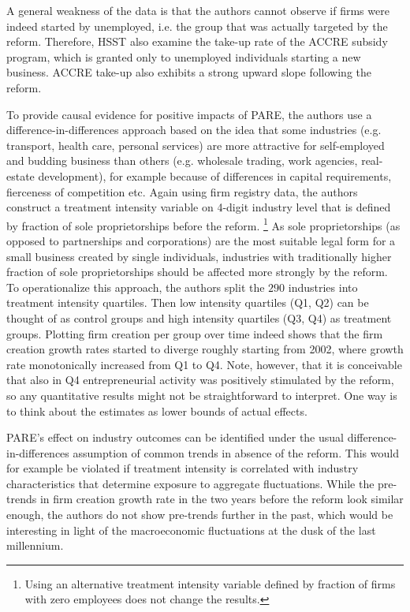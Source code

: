 A general weakness of the data is that the authors cannot observe if firms were indeed started by unemployed, i.e. the group that was actually targeted by the reform. Therefore, HSST also examine the take-up rate of the ACCRE subsidy program, which is granted only to unemployed individuals starting a new business. ACCRE take-up also exhibits a strong upward slope following the reform.  \newline

\noindent To provide causal evidence for positive impacts of PARE, the authors use a difference-in-differences approach based on the idea that some industries (e.g. transport, health care, personal services) are more attractive for self-employed and budding business than others (e.g. wholesale trading, work agencies, real-estate development), for example because of differences in capital requirements, fierceness of competition etc. Again using firm registry data, the authors construct a treatment intensity variable on 4-digit industry level that is defined by fraction of sole proprietorships before the reform. 
\footnote{Using an alternative treatment intensity variable defined by fraction of firms with zero employees does not change the results.}
As sole proprietorships (as opposed to partnerships and corporations) are the most suitable legal form for a small business created by single individuals, industries with traditionally higher fraction of sole proprietorships should be affected more strongly by the reform.
To operationalize this approach, the authors split the $290$ industries into treatment intensity quartiles. Then low intensity quartiles (Q1, Q2) can be thought of as control groups and high intensity quartiles (Q3, Q4) as treatment groups.  Plotting firm creation per group over time indeed shows that the firm creation growth rates started to diverge roughly starting from 2002, where growth rate monotonically increased from Q1 to Q4. Note, however, that it is conceivable that also in Q4 entrepreneurial activity was positively stimulated by the reform, so any quantitative results might not be straightforward to interpret. One way is to think about the estimates as lower bounds of actual effects. \newline

\noindent PARE's effect on industry outcomes can be identified under the usual difference-in-differences assumption of common trends in absence of the reform. This would for example be violated if treatment intensity is correlated with industry characteristics that determine exposure to aggregate fluctuations. While the pre-trends in firm creation growth rate in the two years before the reform look similar enough, the authors do not show pre-trends further in the past, which would be interesting in light of the macroeconomic fluctuations at the dusk of the last millennium. 

